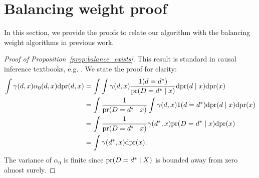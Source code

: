 \section{Balancing weight proof}\label{sec:balancing}

In this section, we provide the proofs to relate our algorithm with the balancing weight algorithms in previous work.

\begin{proof}[Proof of Proposition~\ref{prop:balance_exists}]
This result is standard in causal inference textbooks, e.g.  \cite[Technical Point 3.1]{hernan2010causal}. We state the proof for clarity:
\begin{align*}
 \int \gamma (d,x)\alpha_0(d,x)\mathrm{d}\text{\normalfont pr}(d,x)
    &= \int \int  \gamma(d,x) \frac{1(d=d^*)}{\text{\normalfont pr}(D=d^* \mid x)}  \mathrm{d}\text{\normalfont pr}(d \mid x) \mathrm{d}\text{\normalfont pr}(x)   \\
    &= \int \frac{1}{\text{\normalfont pr}(D=d^* \mid x)}  \int \gamma(d,x)1(d=d^*) \mathrm{d}\text{\normalfont pr}(d \mid x)\mathrm{d}\text{\normalfont pr}(x)  \\
    &= \int \frac{1}{\text{\normalfont pr}(D=d^* \mid x)} \gamma(d^*,x) \text{\normalfont pr}(D=d^* \mid x) \mathrm{d}\text{\normalfont pr}(x) \\
    &=\int \gamma(d^*,x)\mathrm{d}\text{\normalfont pr}(x).
\end{align*}
The variance of $\alpha_0$ is finite since $\text{\normalfont pr}(D=d^* \mid X)$ is bounded away from zero almost surely.
\end{proof}

